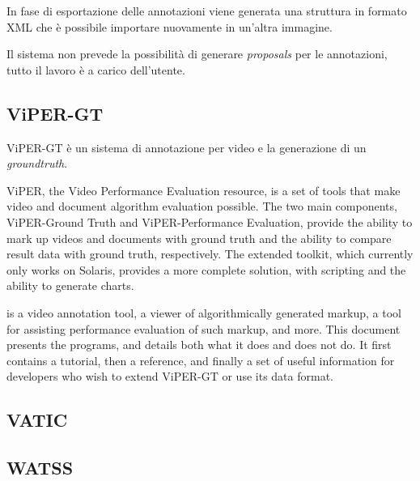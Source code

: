 In fase di esportazione delle annotazioni viene generata una struttura in formato XML che è possibile importare nuovamente in un'altra immagine.

Il sistema non prevede la possibilità di generare \emph{proposals} per le annotazioni, tutto il lavoro è a carico dell'utente.

\subsection{ViPER-GT}

ViPER-GT è un sistema di annotazione per video e la generazione di un \emph{groundtruth}.

ViPER, the Video Performance Evaluation resource, is a set of tools that make video and document algorithm evaluation possible. The two main components, ViPER-Ground Truth and ViPER-Performance Evaluation, provide the ability to mark up videos and documents with ground truth and the ability to compare result data with ground truth, respectively. The extended toolkit, which currently only works on Solaris, provides a more complete solution, with scripting and the ability to generate charts.




is a video annotation tool, a viewer of algorithmically generated markup, a tool for assisting performance evaluation of such markup, and more. This document presents the programs, and details both what it does and does not do. It first contains a tutorial, then a reference, and finally a set of useful information for developers who wish to extend ViPER-GT or use its data format.


\subsection{VATIC}

\subsection{WATSS}
